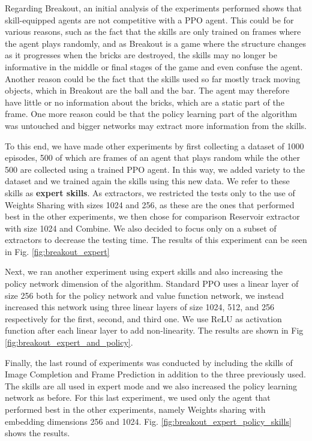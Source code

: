 Regarding Breakout, an initial analysis of the experiments performed shows that skill-equipped agents are not competitive with a PPO agent. This could be for various reasons, such as the fact that the skills are only trained on frames where the agent plays randomly, and as Breakout is a game where the structure changes as it progresses when the bricks are destroyed, the skills may no longer be informative in the middle or final stages of the game and even confuse the agent.
Another reason could be the fact that the skills used so far mostly track moving objects, which in Breakout are the ball and the bar. The agent may therefore have little or no information about the bricks, which are a static part of the frame.
One more reason could be that the policy learning part of the algorithm was untouched and bigger networks may extract more information from the skills.

To this end, we have made other experiments by first collecting a dataset of 1000 episodes, 500 of which are frames of an agent that plays random while the other 500 are collected using a trained PPO agent. In this way, we added variety to the dataset and we trained again the skills using this new data. We refer to these skills as \textbf{expert skills}.
As extractors, we restricted the tests only to the use of Weights Sharing with sizes 1024 and 256, as these are the ones that performed best in the other experiments, we then chose for comparison Reservoir extractor with size 1024 and Combine. We also decided to focus only on a subset of extractors to decrease the testing time.
The results of this experiment can be seen in Fig. \ref{fig:breakout_expert}

Next, we ran another experiment using expert skills and also increasing the policy network dimension of the algorithm. Standard PPO uses a linear layer of size 256 both for the policy network and value function network, we instead increased this network using three linear layers of size 1024, 512, and 256 respectively for the first, second, and third one. We use ReLU as activation function after each linear layer to add non-linearity.
The results are shown in Fig \ref{fig:breakout_expert_and_policy}.

Finally, the last round of experiments was conducted by including the skills of Image Completion and Frame Prediction in addition to the three previously used. The skills are all used in expert mode and we also increased the policy learning network as before.
For this last experiment, we used only the agent that performed best in the other experiments, namely Weights sharing with embedding dimensions 256 and 1024.
Fig. \ref{fig:breakout_expert_policy_skills} shows the results.

